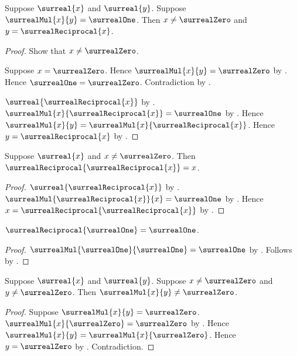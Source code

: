 \begin{theorem}\label{surreal_reciprocal_unique}
    Suppose $\surreal{x}$ and $\surreal{y}$.
    Suppose $\surrealMul{x}{y}=\surrealOne$.
    Then $x\neq\surrealZero$ and
        $y=\surrealReciprocal{x}$.
\end{theorem}
\begin{proof}
    Show that $x\neq\surrealZero$.
    \begin{subproof}
        Suppose $x=\surrealZero$.
        Hence $\surrealMul{x}{y}=\surrealZero$
            by .
        Hence $\surrealOne=\surrealZero$.
        Contradiction by
            .
    \end{subproof}
    $\surreal{\surrealReciprocal{x}}$
        by .
    $\surrealMul{x}{\surrealReciprocal{x}}=\surrealOne$
        by .
    Hence $\surrealMul{x}{y}
        =\surrealMul{x}{\surrealReciprocal{x}}$.
    Hence $y=\surrealReciprocal{x}$
        by .
\end{proof}

\begin{corollary}\label{surreal_reciprocal_involutive}
    Suppose $\surreal{x}$ and $x\neq\surrealZero$.
    Then $\surrealReciprocal{\surrealReciprocal{x}}=x$.
\end{corollary}
\begin{proof}
    $\surreal{\surrealReciprocal{x}}$
        by .
    $\surrealMul{\surrealReciprocal{x}}{x}=\surrealOne$
        by .
    Hence $x=\surrealReciprocal{\surrealReciprocal{x}}$
        by .
\end{proof}

\begin{corollary}\label{surreal_reciprocal_one}
    $\surrealReciprocal{\surrealOne}=\surrealOne$.
\end{corollary}
\begin{proof}
    $\surrealMul{\surrealOne}{\surrealOne}=\surrealOne$
        by .
    Follows by
        .
\end{proof}

\begin{lemma}\label{surreal_mul_nonzero}
    Suppose $\surreal{x}$ and $\surreal{y}$.
    Suppose $x\neq\surrealZero$ and $y\neq\surrealZero$.
    Then $\surrealMul{x}{y}\neq\surrealZero$.
\end{lemma}
\begin{proof}
    Suppose $\surrealMul{x}{y}=\surrealZero$.
    $\surrealMul{x}{\surrealZero}=\surrealZero$
        by .
    Hence $\surrealMul{x}{y}=\surrealMul{x}{\surrealZero}$.
    Hence $y=\surrealZero$
        by .
    Contradiction.
\end{proof}

